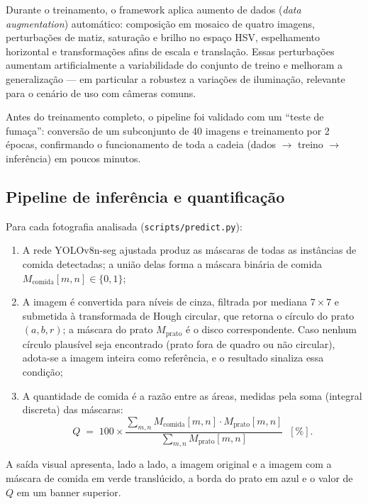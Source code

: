 \documentclass[12pt,a4paper]{article}
\begin{document}
Durante o treinamento, o framework aplica aumento de dados (\emph{data augmentation})
automático: composição em mosaico de quatro imagens, perturbações de matiz, saturação e
brilho no espaço HSV, espelhamento horizontal e transformações afins de escala e translação.
Essas perturbações aumentam artificialmente a variabilidade do conjunto de treino e melhoram
a generalização --- em particular a robustez a variações de iluminação, relevante para o
cenário de uso com câmeras comuns.

Antes do treinamento completo, o pipeline foi validado com um ``teste de fumaça'': conversão
de um subconjunto de 40 imagens e treinamento por 2 épocas, confirmando o funcionamento de
toda a cadeia (dados $\rightarrow$ treino $\rightarrow$ inferência) em poucos minutos.

\subsection{Pipeline de inferência e quantificação}

Para cada fotografia analisada (\texttt{scripts/predict.py}):

\begin{enumerate}
  \item A rede YOLOv8n-seg ajustada produz as máscaras de todas as instâncias de comida
        detectadas; a união delas forma a máscara binária de comida
        $M_{\text{comida}}[m,n] \in \{0,1\}$;
  \item A imagem é convertida para níveis de cinza, filtrada por mediana $7\times7$ e
        submetida à transformada de Hough circular, que retorna o círculo do prato
        $(a, b, r)$; a máscara do prato $M_{\text{prato}}$ é o disco correspondente.
        Caso nenhum círculo plausível seja encontrado (prato fora de quadro ou não circular),
        adota-se a imagem inteira como referência, e o resultado sinaliza essa condição;
  \item A quantidade de comida é a razão entre as áreas, medidas pela soma (integral discreta)
        das máscaras:
        \begin{equation}
          Q \;=\; 100 \times
          \frac{\displaystyle\sum_{m,n} M_{\text{comida}}[m,n]\cdot M_{\text{prato}}[m,n]}
               {\displaystyle\sum_{m,n} M_{\text{prato}}[m,n]} \;\; [\%].
          \label{eq:quantidade}
        \end{equation}
\end{enumerate}

A saída visual apresenta, lado a lado, a imagem original e a imagem com a máscara de comida em
verde translúcido, a borda do prato em azul e o valor de $Q$ em um banner superior.
\end{document}
